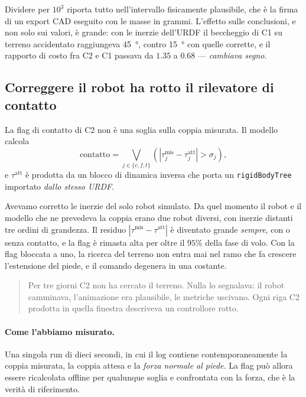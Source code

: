 \documentclass[11pt,a4paper]{article}
\newcommand{\Co}{\textsf{C1}}
\newcommand{\Ct}{\textsf{C2}}
\begin{document}
Dividere per $10^3$ riporta tutto nell'intervallo fisicamente plausibile, che
\`e la firma di un export CAD eseguito con le masse in grammi. L'effetto sulle
conclusioni, e non solo sui valori, \`e grande: con le inerzie dell'URDF il
beccheggio di \Co{} su terreno accidentato raggiungeva \SI{45}{\degree}, contro
\SI{15}{\degree} con quelle corrette, e il rapporto di costo fra \Ct{} e \Co{}
passava da $1.35$ a $0.68$ --- \emph{cambiava segno}.

\subsection{Correggere il robot ha rotto il rilevatore di contatto}
\label{sec:estimator}

La flag di contatto di \Ct{} non \`e una soglia sulla coppia misurata. Il
modello calcola
\begin{equation}
\mathrm{contatto} = \bigvee_{j\in\{c,f,t\}}
\left( \left| \tau_j^{\mathrm{mis}} - \tau_j^{\mathrm{att}} \right| > \sigma_j \right),
\label{eq:flag}
\end{equation}
e $\tau^{\mathrm{att}}$ \`e prodotta da un blocco di dinamica inversa che porta
un \texttt{rigidBodyTree} importato \emph{dallo stesso URDF}.

Avevamo corretto le inerzie del solo robot simulato. Da quel momento il robot e
il modello che ne prevedeva la coppia erano due robot diversi, con inerzie
distanti tre ordini di grandezza. Il residuo
$|\tau^{\mathrm{mis}} - \tau^{\mathrm{att}}|$ \`e diventato grande
\emph{sempre}, con o senza contatto, e la flag \`e rimasta alta per oltre il
$95\%$ della fase di volo. Con la flag bloccata a uno, la ricerca del terreno
non entra mai nel ramo che fa crescere l'estensione del piede, e il comando
degenera in una costante.

\begin{quote}
Per tre giorni \Ct{} non ha cercato il terreno. Nulla lo segnalava: il robot
camminava, l'animazione era plausibile, le metriche uscivano. Ogni riga \Ct{}
prodotta in quella finestra descriveva un controllore rotto.
\end{quote}

\paragraph{Come l'abbiamo misurato.} Una singola run di dieci secondi, in cui
il log contiene contemporaneamente la coppia misurata, la coppia attesa e la
\emph{forza normale al piede}. La flag pu\`o allora essere ricalcolata offline
per qualunque soglia e confrontata con la forza, che \`e la verit\`a di
riferimento.
\end{document}
